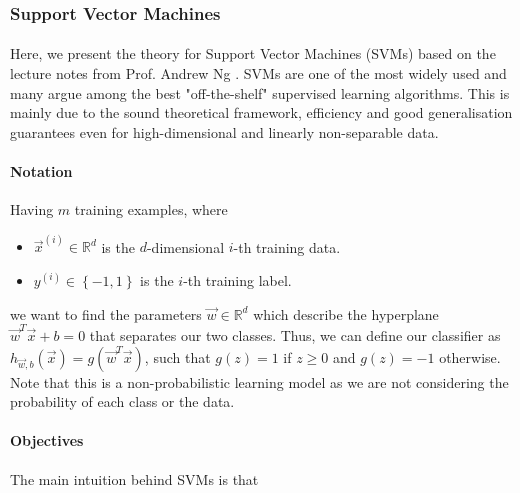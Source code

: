 \subsubsection{Support Vector Machines}

\paragraph{}
	Here, we present the theory for Support Vector Machines (SVMs) based on the lecture notes from Prof. Andrew Ng \cite{ng13}. SVMs are one of the most widely used and many argue among the best "off-the-shelf" supervised learning algorithms. This is mainly due to the sound theoretical framework, efficiency and good generalisation guarantees even for high-dimensional and linearly non-separable data.
	
\paragraph{Notation}
	Having $m$ training examples, where
	
	\begin{itemize}

  		\item $\vec{x}^{(i)} \in \mathbb{R}^d$ is the $d$-dimensional $i$-th training data.
  		\item $y^{(i)} \in \left\{-1, 1 \right\}$ is the $i$-th training label.

	\end{itemize}
	
	we want to find the parameters $\vec{w} \in \mathbb{R}^d$ which describe the hyperplane $\vec{w}^T \vec{x} + b = 0$ that separates our two classes. Thus, we can define our classifier as $h_{\vec{w}, b}(\vec{x}) = g\left(\vec{w}^T \vec{x}\right)$, such that $g(z) = 1$ if $z \geq 0$ and $g(z) = -1$ otherwise. Note that this is a non-probabilistic learning model as we are not considering the probability of each class or the data.
	
\paragraph{Objectives}
	The main intuition behind SVMs is that 